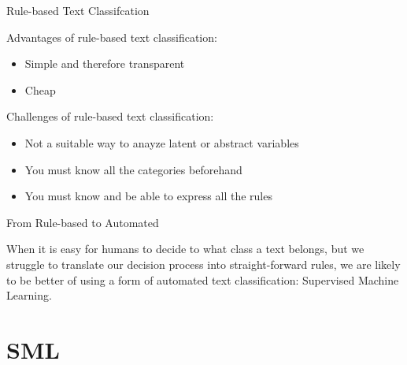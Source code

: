 \documentclass[handout]{beamer}
\begin{document}
	\begin{frame}{Rule-based Text Classifcation} 
	
	Advantages of rule-based text classification:
	\begin{itemize}
		\item Simple and therefore transparent
		\item Cheap
	\end{itemize}
	
	Challenges of rule-based text classification:
	\begin{itemize}
		\item Not a suitable way to anayze latent or abstract variables 
		\item You must know all the categories beforehand
		\item You must know and be able to express all the rules
	\end{itemize}

	\end{frame}


\begin{frame}{From Rule-based to Automated}

	When it is easy for humans to decide to what class a text belongs, but we struggle to translate our decision process into straight-forward rules, we are likely to be better of using a form of automated text classification: Supervised Machine Learning.
	
\end{frame}


	
	\section{SML}
	
\end{document}
